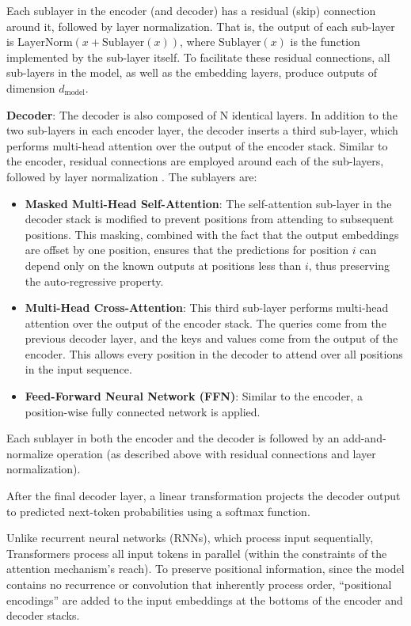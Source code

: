 Each sublayer in the encoder (and decoder) has a residual (skip) connection around it, followed by layer normalization. 
That is, the output of each sub-layer is $\text{LayerNorm}(x + \text{Sublayer}(x))$, where $\text{Sublayer}(x)$ is the function implemented by the sub-layer itself. 
To facilitate these residual connections, all sub-layers in the model, as well as the embedding layers, produce outputs of dimension $d_{\text{model}}$.

\textbf{Decoder}:
The decoder is also composed of N identical layers. In addition to the two sub-layers in each encoder layer, the decoder inserts a third sub-layer, which performs multi-head attention over the output of the encoder stack. 
Similar to the encoder, residual connections are employed around each of the sub-layers, followed by layer normalization \cite{vaswani2017attention}. 
The sublayers are:

\begin{itemize}
    \item \textbf{Masked Multi-Head Self-Attention}: The self-attention sub-layer in the decoder stack is modified to prevent positions from attending to subsequent positions. This masking, combined with the fact that the output embeddings are offset by one position, ensures that the predictions for position $i$ can depend only on the known outputs at positions less than $i$, thus preserving the auto-regressive property.
    \item \textbf{Multi-Head Cross-Attention}: This third sub-layer performs multi-head attention over the output of the encoder stack. The queries come from the previous decoder layer, and the keys and values come from the output of the encoder. This allows every position in the decoder to attend over all positions in the input sequence.
    \item \textbf{Feed-Forward Neural Network (FFN)}: Similar to the encoder, a position-wise fully connected network is applied.  
\end{itemize}

Each sublayer in both the encoder and the decoder is followed by an add-and-normalize operation (as described above with residual connections and layer normalization).

After the final decoder layer, a linear transformation projects the decoder output to predicted next-token probabilities using a softmax function.

Unlike recurrent neural networks (RNNs), which process input sequentially, Transformers process all input tokens in parallel (within the constraints of the attention mechanism's reach). 
To preserve positional information, since the model contains no recurrence or convolution that inherently process order, ``positional encodings'' are added to the input embeddings at the bottoms of the encoder and decoder stacks.

